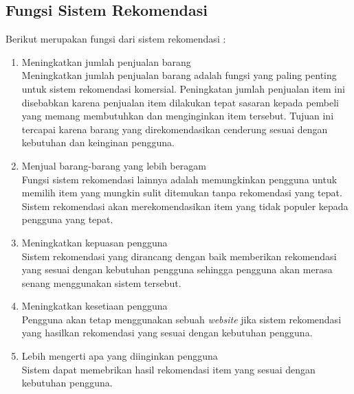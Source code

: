 \subsection{Fungsi Sistem Rekomendasi}
Berikut merupakan fungsi dari sistem rekomendasi \cite{buku:sistem:rekomendasi} :
	\begin{enumerate}
		\item Meningkatkan jumlah penjualan barang\\
			Meningkatkan jumlah penjualan barang adalah fungsi yang paling penting untuk sistem rekomendasi komersial. Peningkatan jumlah penjualan item ini disebabkan karena penjualan item dilakukan tepat sasaran kepada pembeli yang memang membutuhkan dan menginginkan item tersebut. Tujuan ini tercapai karena barang yang direkomendasikan cenderung sesuai dengan kebutuhan dan keinginan pengguna.
			
		\item Menjual barang-barang yang lebih beragam\\
			Fungsi sistem rekomendasi lainnya adalah memungkinkan pengguna untuk memilih item yang mungkin sulit ditemukan tanpa rekomendasi yang tepat. Sistem rekomendasi akan merekomendasikan item yang tidak populer kepada pengguna yang tepat.
			
		\item Meningkatkan kepuasan pengguna\\
			Sistem rekomendasi yang dirancang dengan baik memberikan rekomendasi yang sesuai dengan kebutuhan pengguna sehingga pengguna akan merasa senang menggunakan sistem tersebut.
		
		\item Meningkatkan kesetiaan pengguna\\
			Pengguna akan tetap menggunakan sebuah \textit{website} jika sistem rekomendasi yang hasilkan rekomendasi yang sesuai dengan kebutuhan pengguna. 
			
		\item Lebih mengerti apa yang diinginkan pengguna\\
			Sistem dapat memebrikan hasil rekomendasi item yang sesuai dengan kebutuhan pengguna.
	\end{enumerate} \leavevmode

